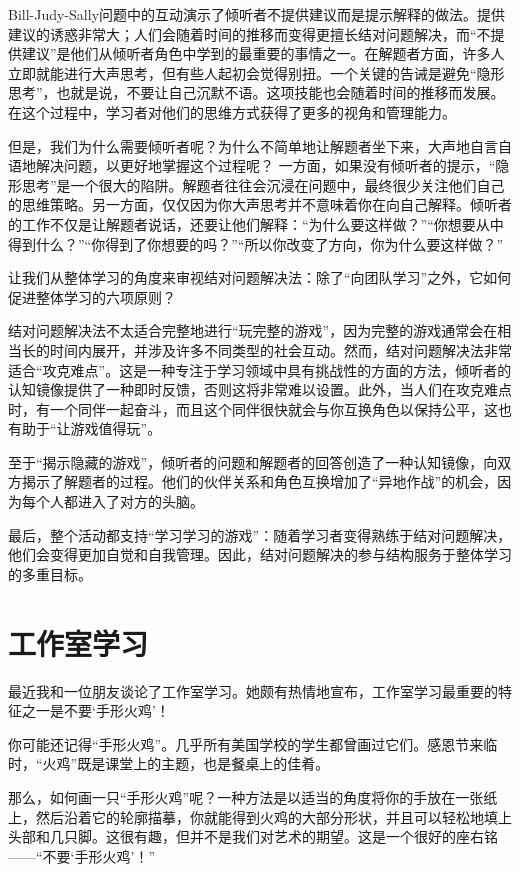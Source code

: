 Bill-Judy-Sally问题中的互动演示了倾听者不提供建议而是提示解释的做法。提供建议的诱惑非常大；人们会随着时间的推移而变得更擅长结对问题解决，而“不提供建议”是他们从倾听者角色中学到的最重要的事情之一。在解题者方面，许多人立即就能进行大声思考，但有些人起初会觉得别扭。一个关键的告诫是避免“隐形思考”，也就是说，不要让自己沉默不语。这项技能也会随着时间的推移而发展。在这个过程中，学习者对他们的思维方式获得了更多的视角和管理能力。

但是，我们为什么需要倾听者呢？为什么不简单地让解题者坐下来，大声地自言自语地解决问题，以更好地掌握这个过程呢？
一方面，如果没有倾听者的提示，“隐形思考”是一个很大的陷阱。解题者往往会沉浸在问题中，最终很少关注他们自己的思维策略。另一方面，仅仅因为你大声思考并不意味着你在向自己解释。倾听者的工作不仅是让解题者说话，还要让他们解释：“为什么要这样做？”“你想要从中得到什么？”“你得到了你想要的吗？”“所以你改变了方向，你为什么要这样做？”

让我们从整体学习的角度来审视结对问题解决法：除了“向团队学习”之外，它如何促进整体学习的六项原则？

结对问题解决法不太适合完整地进行“玩完整的游戏”，因为完整的游戏通常会在相当长的时间内展开，并涉及许多不同类型的社会互动。然而，结对问题解决法非常适合“攻克难点”。这是一种专注于学习领域中具有挑战性的方面的方法，倾听者的认知镜像提供了一种即时反馈，否则这将非常难以设置。此外，当人们在攻克难点时，有一个同伴一起奋斗，而且这个同伴很快就会与你互换角色以保持公平，这也有助于“让游戏值得玩”。

至于“揭示隐藏的游戏”，倾听者的问题和解题者的回答创造了一种认知镜像，向双方揭示了解题者的过程。他们的伙伴关系和角色互换增加了“异地作战”的机会，因为每个人都进入了对方的头脑。

最后，整个活动都支持“学习学习的游戏”：随着学习者变得熟练于结对问题解决，他们会变得更加自觉和自我管理。因此，结对问题解决的参与结构服务于整体学习的多重目标。

\section*{工作室学习}

最近我和一位朋友谈论了工作室学习。她颇有热情地宣布，工作室学习最重要的特征之一是不要‘手形火鸡’！

你可能还记得“手形火鸡”。几乎所有美国学校的学生都曾画过它们。感恩节来临时，“火鸡”既是课堂上的主题，也是餐桌上的佳肴。

那么，如何画一只“手形火鸡”呢？一种方法是以适当的角度将你的手放在一张纸上，然后沿着它的轮廓描摹，你就能得到火鸡的大部分形状，并且可以轻松地填上头部和几只脚。这很有趣，但并不是我们对艺术的期望。这是一个很好的座右铭——“不要‘手形火鸡’！”

